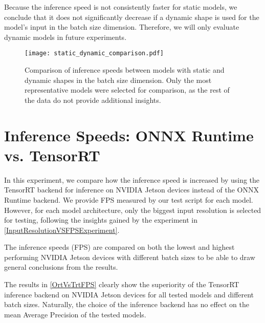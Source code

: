 Because the inference speed is not consistently faster for static models, we
conclude that it does not significantly decrease if a dynamic shape is used for
the model's input in the batch size dimension. Therefore, we will only evaluate
dynamic models in future experiments.





\begin{figure}[h]
    \begin{framed}
        \centering
        \texttt{[image: static\_dynamic\_comparison.pdf]}
        \caption{Comparison of inference speeds between models with static and
        dynamic shapes in the batch size dimension. Only the most representative
        models were selected for comparison, as the rest of the data do not
        provide additional insights.}
        \label{StaticDynamicModelShape}
    \end{framed}
\end{figure}








\section{Inference Speeds: ONNX Runtime vs. TensorRT}

In this experiment, we compare how the inference speed is increased by using the
TensorRT backend for inference on NVIDIA Jetson devices instead of the ONNX
Runtime backend. We provide FPS measured by our test script for each model.
However, for each model architecture, only the biggest input resolution is selected
for testing, following the insights gained by the experiment in
\autoref{InputResolutionVSFPSExperiment}.

The inference speeds (FPS) are compared on both the lowest and highest
performing NVIDIA Jetson devices with different batch sizes to be able to draw
general conclusions from the results.

The results in \autoref{OrtVsTrtFPS} clearly show the superiority of the
TensorRT inference backend on NVIDIA Jetson devices for all tested models and
different batch sizes. Naturally, the choice of the inference backend has no
effect on the mean Average Precision of the tested models.

